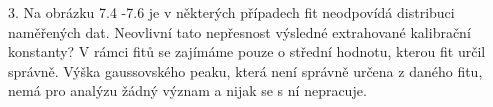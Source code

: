\documentclass{beamer}
\begin{document}
\begin{frame}{}
3. Na obrázku 7.4 -7.6 je v některých případech fit neodpovídá distribuci naměřených dat. Neovlivní tato nepřesnost výsledné extrahované kalibrační konstanty?
\newline
\newline
\newline
V rámci fitů se zajímáme pouze o střední hodnotu, kterou fit určil správně. Výška gaussovského peaku, která není správně určena z daného fitu, nemá pro analýzu žádný význam a nijak se s ní nepracuje.
\end{frame}
\end{document}
